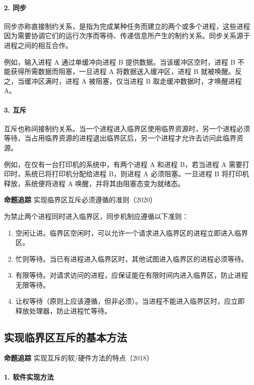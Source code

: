 \documentclass{ctexbook}
\begin{document}
	\paragraph{2. 同步}
	
	同步亦称直接制约关系，是指为完成某种任务而建立的两个或多个进程，这些进程因为需要协调它们的运行次序而等待、传递信息所产生的制约关系。同步关系源于进程之间的相互合作。
	
	例如，输入进程 A 通过单缓冲向进程 B 提供数据。当该缓冲区空时，进程 B 不能获得所需数据而阻塞，一旦进程 A 将数据送入缓冲区，进程 B 就被唤醒。反之，当缓冲区满时，进程 A 被阻塞，仅当进程 B 取走缓冲数据时，才唤醒进程 A。
	
	\paragraph{3. 互斥}
	
	互斥也称间接制约关系。当一个进程进入临界区使用临界资源时，另一个进程必须等待，当占用临界资源的进程退出临界区后，另一个进程才允许去访问此临界资源。
	
	例如，在仅有一台打印机的系统中，有两个进程 A 和进程 B，若当进程 A 需要打印时，系统已将打印机分配给进程 B，则进程 A 必须阻塞。一旦进程 B 将打印机释放，系统便将进程 A 唤醒，并将其由阻塞态变为就绪态。
	
	\textbf{命题追踪} 实现临界区互斥必须遵循的准则（2020）
	
	为禁止两个进程同时进入临界区，同步机制应遵循以下准则：
	\begin{enumerate}
		\item 空闲让进。临界区空闲时，可以允许一个请求进入临界区的进程立即进入临界区。
		\item 忙则等待。当已有进程进入临界区时，其他试图进入临界区的进程必须等待。
		\item 有限等待。对请求访问的进程，应保证能在有限时间内进入临界区，防止进程无限等待。
		\item 让权等待（原则上应该遵循，但非必须）。当进程不能进入临界区时，应立即释放处理器，防止进程忙等待。
	\end{enumerate}
	
	\subsection{实现临界区互斥的基本方法}
	
	\textbf{命题追踪} 实现互斥的软/硬件方法的特点（2018）
	
	
	\paragraph{1. 软件实现方法}
	
\end{document}
